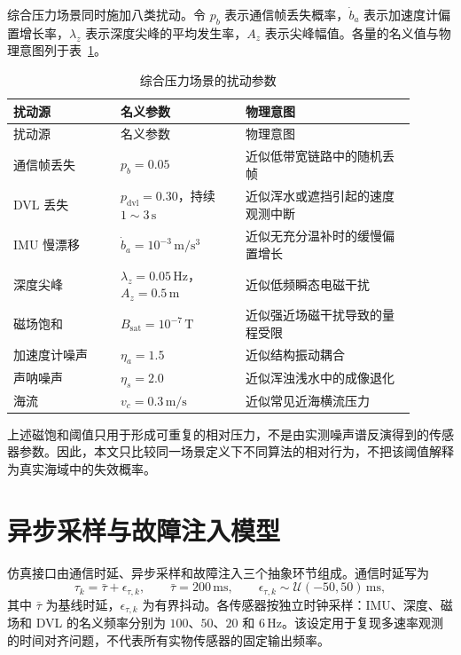 综合压力场景同时施加八类扰动。令 \(p_b\) 表示通信帧丢失概率，\(\dot b_a\) 表示加速度计偏置增长率，\(\lambda_z\) 表示深度尖峰的平均发生率，\(A_z\) 表示尖峰幅值。各量的名义值与物理意图列于表~\ref{tab:app-a-combined-stress}。

\begin{longtable}{@{}>{\raggedright\arraybackslash}p{0.24\linewidth}>{\raggedright\arraybackslash}p{0.28\linewidth}>{\raggedright\arraybackslash}p{0.38\linewidth}@{}}
\caption{综合压力场景的扰动参数}\label{tab:app-a-combined-stress}\\
\toprule
扰动源 & 名义参数 & 物理意图 \\
\midrule
\endfirsthead
\toprule
扰动源 & 名义参数 & 物理意图 \\
\midrule
\endhead
\bottomrule
\endfoot
通信帧丢失 & \(p_b=0.05\) & 近似低带宽链路中的随机丢帧 \\
DVL 丢失 & \(p_{\mathrm{dvl}}=0.30\)，持续 \(1\sim3\,\mathrm{s}\) & 近似浑水或遮挡引起的速度观测中断 \\
IMU 慢漂移 & \(\dot b_a=10^{-3}\,\mathrm{m/s^3}\) & 近似无充分温补时的缓慢偏置增长 \\
深度尖峰 & \(\lambda_z=0.05\,\mathrm{Hz}\)，\(A_z=0.5\,\mathrm{m}\) & 近似低频瞬态电磁干扰 \\
磁场饱和 & \(B_{\mathrm{sat}}=10^{-7}\,\mathrm{T}\) & 近似强近场磁干扰导致的量程受限 \\
加速度计噪声 & \(\eta_a=1.5\) & 近似结构振动耦合 \\
声呐噪声 & \(\eta_s=2.0\) & 近似浑浊浅水中的成像退化 \\
海流 & \(v_c=0.3\,\mathrm{m/s}\) & 近似常见近海横流压力 \\
\end{longtable}

上述磁饱和阈值只用于形成可重复的相对压力，不是由实测噪声谱反演得到的传感器参数。因此，本文只比较同一场景定义下不同算法的相对行为，不把该阈值解释为真实海域中的失效概率。

\section{异步采样与故障注入模型}\label{sec:app-a-2}

仿真接口由通信时延、异步采样和故障注入三个抽象环节组成。通信时延写为
\begin{equation}
  \tau_k=\bar{\tau}+\epsilon_{\tau,k},
  \qquad
  \bar{\tau}=200\,\mathrm{ms},
  \qquad
  \epsilon_{\tau,k}\sim\mathcal{U}(-50,50)\,\mathrm{ms},
  \label{eq:app-comm-delay}
\end{equation}
其中 \(\bar{\tau}\) 为基线时延，\(\epsilon_{\tau,k}\) 为有界抖动。各传感器按独立时钟采样：IMU、深度、磁场和 DVL 的名义频率分别为 \(100\)、\(50\)、\(20\) 和 \(6\,\mathrm{Hz}\)。该设定用于复现多速率观测的时间对齐问题，不代表所有实物传感器的固定输出频率。

